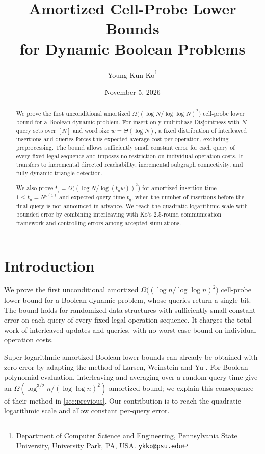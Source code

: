 \documentclass[11pt]{article}
\title{Amortized Cell-Probe Lower Bounds \\ for Dynamic Boolean Problems}
\author{Young Kun Ko\thanks{Department of Computer Science and Engineering, Pennsylvania State University, University Park, PA, USA. \texttt{ykko@psu.edu}}}
\date{November 5, 2026}
\theoremstyle{plain}
\begin{document}
\maketitle

\begin{abstract}
We prove the first unconditional amortized $\Omega\big((\log N/\log\log N)^2\big)$ cell-probe lower bound for a Boolean dynamic problem. For insert-only multiphase Disjointness with $N$ query sets over $[N]$ and word size $w=\Theta(\log N)$, a fixed distribution of interleaved insertions and queries forces this expected average cost per operation, excluding preprocessing. The bound allows sufficiently small constant error for each query of every fixed legal sequence and imposes no restriction on individual operation costs. It transfers to incremental directed reachability, incremental subgraph connectivity, and fully dynamic triangle detection.

We also prove $t_q=\Omega\big((\log N/\log(t_uw))^2\big)$ for amortized insertion time $1\le t_u=N^{o(1)}$ and expected query time $t_q$, when the number of insertions before the final query is not announced in advance. We reach the quadratic-logarithmic scale with bounded error by combining interleaving with Ko's 2.5-round communication framework and controlling errors among accepted simulations.
\end{abstract}


\newpage
\section{Introduction}\label{sec:intro}

We prove the first unconditional amortized $\Omega\big((\log n/\log\log n)^2\big)$ cell-probe lower bound for a Boolean dynamic problem, whose queries return a single bit. The bound holds for randomized data structures with sufficiently small constant error on each query of every fixed legal operation sequence. It charges the total work of interleaved updates and queries, with no worst-case bound on individual operation costs.

Super-logarithmic amortized Boolean lower bounds can already be obtained with zero error by adapting the method of Larsen, Weinstein and Yu \cite{larsen_crossing_2020}. For Boolean polynomial evaluation, interleaving and averaging over a random query time give an $\Omega(\log^{3/2}n/(\log\log n)^2)$ amortized bound; we explain this consequence of their method in \cref{sec:previous}. Our contribution is to reach the quadratic-logarithmic scale and allow constant per-query error.
\end{document}
